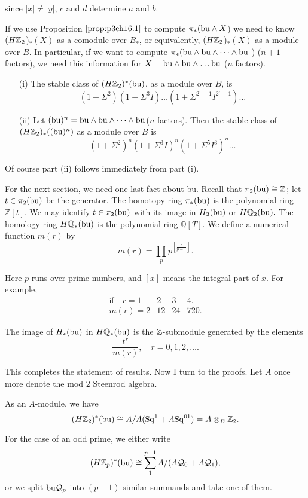 \documentclass[../main]{subfiles}
\begin{document}
since $|x| \neq |y|$, $c$ and $d$ determine $a$ and $b$.

If we use Proposition $\ref{prop:p3ch16.1}$ to compute $\pi_{\ast}(\mathrm{bu}  \wedge X$) we need to know $(H\mathbb{Z}_2$)$_{\ast}(X)$ as a comodule over $B_{\ast}$, or equivalently, $(H\mathbb{Z}_2$)$_{\ast}(X)$ as a module over $B$. In particular, if we want to compute $\pi_{\ast}(\mathrm{bu} \wedge \mathrm{bu} \wedge\dots \wedge \mathrm{bu}$ ) ($n+1$ factors), we need this information for $X=\mathrm{bu} \wedge \mathrm{bu} \wedge\dots \mathrm{bu} $ ($n$ factors).

\begin{proposition} \label{prop:p3ch16.4}\mbox{} %
\begin{enumerate}
    \item[(i)] The stable class of $(H\mathbb{Z}_2)^{\ast}(\mathrm{bu})$, as a module over $B$, is
    \[ (1+\Sigma^{2})(1+\Sigma^{3}I)\dots(1+\Sigma^{2^{r}+1}I^{2^{r}-1})\dots \]
\item[(ii)] Let $(\mathrm{bu})^{n}=\mathrm{bu}\wedge \mathrm{bu} \wedge\dots \wedge \mathrm{bu}$($n$ factors). Then the stable class
of $(H\mathbb{Z}_2)_{\ast}((\mathrm{bu})^{n})$ as a module over $B$ is \[
    (1+\Sigma^{2})^{n}(1+\Sigma^{3}I)^{n}(1+\Sigma^{5}I^{3})^{n}\dots
\]
\end{enumerate}
Of course part (ii) follows immediately from part (i).
\end{proposition}

For the next section, we need one last fact about bu. Recall that $\pi_{2}(\mathrm{bu})\cong \mathbb{Z}$; let $t\in \pi_{2}(\mathrm{bu})$ be the generator. The homotopy ring  $\pi_{\ast}(\mathrm{bu})$ is the polynomial ring $\mathbb Z[t]$. We may identify $t\in \pi_{2}(\mathrm{bu}) $ with its image in $H_{2}(\mathrm{bu})$ or $H\mathbb{Q}_{2}(\mathrm{bu}).$ The homology ring $H\mathbb{Q}_{\ast}(\mathrm{bu})$ is the polynomial ring $\mathbb Q[T]$. We define a numerical function $m(r)$ by \[
    m(r)= \prod_{p}p^{\left[\frac{r}{p-1}\right]}.
\]

Here $p$ runs over prime numbers, and $[x]$ means the integral part of $x$. For example, 
\[ \begin{matrix}
\text{if}\quad  r=1 & 2 & 3 & 4.\\
m(r)=2 & 12 & 24 & 720.
\end{matrix} \]
    
\begin{proposition} \label{prop:p3ch16.5} The image of $H_{\ast}(\mathrm{bu})$ in $H\mathbb{Q}_{\ast}(\mathrm{bu})$ is the $\mathbb{Z}$-submodule generated by the elements \[
    \frac{t^{r}}{m(r)}, \quad r=0, 1, 2, \dots .
\]

\end{proposition}
   This completes the statement of results. Now I turn to the proofs.
Let $A$ once more denote the mod $2$ Steenrod algebra. 
\begin{proposition} \label{prop:p3ch16.6}
    As an $A$-module, we have \[
        (H\mathbb{Z}_2)^{\ast}(\mathrm{bu}) \cong A/A(\mathrm{Sq}^{1}+A\mathrm{Sq}^{01})=A \otimes_{B} \mathbb{Z}_2.
    \]
\end{proposition}
For the case of an odd prime, we either write \[
    (H\mathbb{Z}_{p})^{\ast}(\mathrm{bu}) \cong \sum_{1}^{p-1} A/(A\mathcal{Q}_{0}+A\mathcal{Q}_{1}), 
\]
    or we split $\mathrm{bu} \mathcal{Q}_{p}$ into $(p-1)$ similar summands and take one of them. 
    
\end{document}
